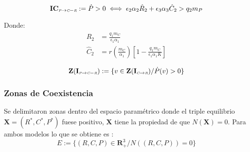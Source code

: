 
\begin{equation} \mathbf{IC_{\textit{\tiny P} \to \textit{\tiny C}-\textit{\tiny R}}} := \dot{P} >0 \iff \epsilon_2\alpha_2\hat{R}_2 + \epsilon_3\alpha_3\hat{C}_2 > q_2 m_P \end{equation}

Donde:
\begin{equation}
\begin{aligned}
\hat{R}_2 &= \frac{q_1 m_C}{\epsilon_1 \alpha_1} \\
\hat{C}_2 &=  r(\frac{m_C}{\alpha_1}) \left[ 1 - \frac{q_1 m_C}{\epsilon_1 \alpha_1 K} \right] 
\end{aligned}
\end{equation}

\begin{equation}
\mathbf{Z(I_{\textit{\tiny P} \to \textit{\tiny C}-\textit{\tiny R}})} := \{ v \in \mathbf{Z(I_{\textit{\tiny C} \to \textit{\tiny R}})} / \dot{P}(v) > 0 \}
\end{equation}


\subsubsection{Zonas de Coexistencia}
Se delimitaron zonas dentro del espacio param\'etrico donde el triple equilibrio $\mathbf{X} = (R^*,C^*,P^*)$ fuese positivo, $\mathbf{X}$ tiene la propiedad de que $N(\mathbf{X}) = 0$. Para ambos modelos lo que se obtiene es :
\begin{equation}\label{eq:Equilibrio}
E:= \{ (R,C,P) \in \mathbf{R}^3_+ / N((R,C,P)) = 0 \}
\end{equation}

